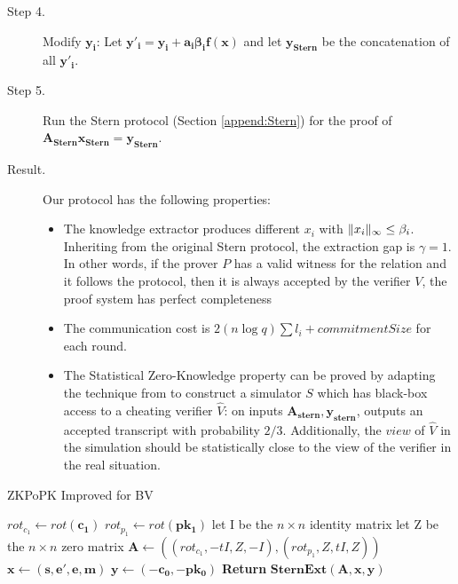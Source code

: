 \begin{description}
\item [Step 4.] Modify $\mathbf{y_i}$: Let $\mathbf{y'_i} = \mathbf{y_i + a_i\beta_if(x)}$ and let $\mathbf{y_{Stern}}$ be
  the concatenation of all $\mathbf{y'_i}$.


\item [Step 5.] Run the Stern protocol (Section \ref{append:Stern}) for the proof of $\mathbf{A_{Stern}x_{Stern} = y_{Stern}}$.

\item [Result.] Our protocol has the following properties:
  \begin{itemize}
  \item The knowledge extractor produces different $x_i$ with
    $\Vert x_i \Vert_{\infty} \leq \beta_i$. Inheriting from the original Stern protocol,
    the extraction gap is $\gamma = 1$. In other words, if the prover $P$ has a
    valid witness for the relation and it follows the protocol, then it is
    always accepted by the verifier $V$, the proof system has perfect
    completeness
  \item The communication cost is $2(n\log q){\sum{l_i}} + commitmentSize$ for
    each round.
  \item The Statistical Zero-Knowledge property can be proved by adapting the
    technique from \cite{stern1993new, kawachi2008concurrently} to construct a
    simulator $S$ which has black-box access to a cheating verifier $\hat{V}$:
    on inputs $\mathbf{A_{stern},y_{stern}}$, outputs an accepted transcript
    with probability $2/3$. Additionally, the $view$ of $\hat{V}$ in the
    simulation should be statistically close to the view of the verifier in the
    real situation.

  \end{itemize}

\end{description}

  \begin{algorithm}
    \caption{ZKPoPK Improved for BV}\label{alg:ZKPBVImproved}
    \begin{algorithmic}[1]
      \State $rot_{c_1} \gets rot(\mathbf{c_1})$
      \State $rot_{p_1} \gets rot(\mathbf{pk_1})$
      \State let I be the $n \times n$ identity matrix
      \State let Z be the $n \times n $ zero matrix
      \State $\mathbf{A} \gets ((rot_{c_1},-tI, Z, -I),(rot_{p_1}, Z, tI,Z)) $
      \State $\mathbf{x} \gets (\mathbf{s, e', e, m})$
      \State $\mathbf{y} \gets (\mathbf{-c_0, -pk_0})$
      \State \textbf{Return} $\mathbf{SternExt(A,x,y)}$
      \EndProcedure
    \end{algorithmic}
  \end{algorithm}


